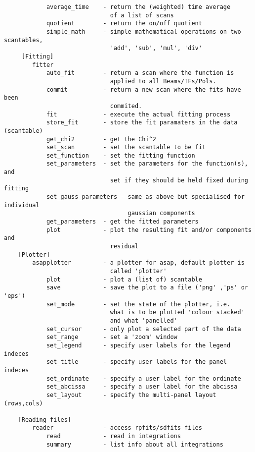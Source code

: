 \documentclass[11pt]{article}
\begin{document}
\begin{verbatim}
            average_time    - return the (weighted) time average
                              of a list of scans
            quotient        - return the on/off quotient
            simple_math     - simple mathematical operations on two scantables,
                              'add', 'sub', 'mul', 'div'
     [Fitting]
        fitter
            auto_fit        - return a scan where the function is
                              applied to all Beams/IFs/Pols.
            commit          - return a new scan where the fits have been
                              commited.
            fit             - execute the actual fitting process
            store_fit       - store the fit paramaters in the data (scantable)
            get_chi2        - get the Chi^2
            set_scan        - set the scantable to be fit
            set_function    - set the fitting function
            set_parameters  - set the parameters for the function(s), and
                              set if they should be held fixed during fitting
            set_gauss_parameters - same as above but specialised for individual
                                   gaussian components
            get_parameters  - get the fitted parameters
            plot            - plot the resulting fit and/or components and
                              residual
    [Plotter]
        asapplotter         - a plotter for asap, default plotter is
                              called 'plotter'
            plot            - plot a (list of) scantable
            save            - save the plot to a file ('png' ,'ps' or 'eps')
            set_mode        - set the state of the plotter, i.e.
                              what is to be plotted 'colour stacked'
                              and what 'panelled'
            set_cursor      - only plot a selected part of the data
            set_range       - set a 'zoom' window
            set_legend      - specify user labels for the legend indeces
            set_title       - specify user labels for the panel indeces
            set_ordinate    - specify a user label for the ordinate
            set_abcissa     - specify a user label for the abcissa
            set_layout      - specify the multi-panel layout (rows,cols)

    [Reading files]
        reader              - access rpfits/sdfits files
            read            - read in integrations
            summary         - list info about all integrations


\end{verbatim}
\end{document}
